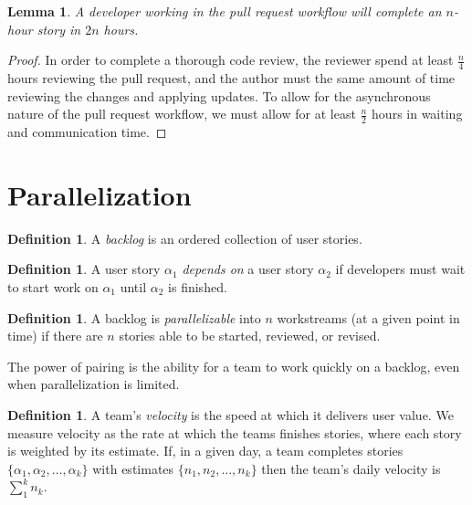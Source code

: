 \documentclass[letterpaper]{article}
\newtheorem{lemma}[theorem]{Lemma}
\theoremstyle{definition}
\newtheorem{definition}[theorem]{Definition}
\begin{document}
    \begin{lemma}
        \label{lemma:solo}
        A developer working in the pull request workflow will complete an $n$-hour story in $2n$ hours.
    \end{lemma}
    \begin{proof}
        In order to complete a thorough code review, the reviewer spend at least $\frac{n}{4}$ hours reviewing the pull
        request, and the author must the same amount of time reviewing the changes and applying updates.
        To allow for the asynchronous nature of the pull request workflow, we must allow for at least $\frac{n}{2}$
        hours in waiting and communication time.
    \end{proof}


    \section{Parallelization}\label{sec:parallelization}

    \begin{definition}
        A \textit{backlog} is an ordered collection of user stories.
    \end{definition}

    \begin{definition}
        A user story $\alpha_1$ \textit{depends on} a user story $\alpha_2$ if developers must wait to start work on
        $\alpha_1$ until $\alpha_2$ is finished.
    \end{definition}

    \begin{definition}
        A backlog is \textit{parallelizable} into $n$ workstreams (at a given point in time) if there are $n$ stories
        able to be started, reviewed, or revised.
    \end{definition}

    The power of pairing is the ability for a team to work quickly on a backlog, even when parallelization is limited.

    \begin{definition}
        A team's \textit{velocity} is the speed at which it delivers user value.
        We measure velocity as the rate at which the teams finishes stories, where each story is weighted by its
        estimate.
        If, in a given day, a team completes stories $\{\alpha_1, \alpha_2,\dots,\alpha_k\}$ with estimates
        $\{n_1, n_2,\dots,n_k\}$ then the team's daily velocity is $\sum_1^k n_k$.
    \end{definition}
\end{document}
